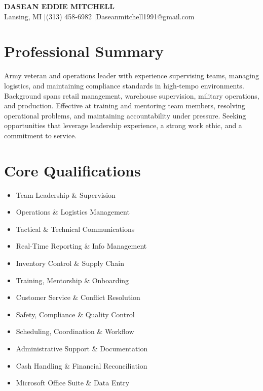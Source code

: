\documentclass[11pt,letterpaper]{article}
\begin{document}
\begin{center}
  {\LARGE\bfseries DASEAN EDDIE MITCHELL}\\[4pt]
  Lansing, MI \enspace$\vert$\enspace (313) 458-6982 \enspace$\vert$\enspace Daseanmitchell1991@gmail.com
\end{center}

\section{Professional Summary}

Army veteran and operations leader with experience supervising teams, managing logistics, and maintaining compliance standards in high-tempo environments. Background spans retail management, warehouse supervision, military operations, and production. Effective at training and mentoring team members, resolving operational problems, and maintaining accountability under pressure. Seeking opportunities that leverage leadership experience, a strong work ethic, and a commitment to service.

\section{Core Qualifications}

\begin{minipage}[t]{0.48\textwidth}
\begin{itemize}
  \item Team Leadership \& Supervision
  \item Operations \& Logistics Management
  \item Tactical \& Technical Communications
  \item Real-Time Reporting \& Info Management
  \item Inventory Control \& Supply Chain
  \item Training, Mentorship \& Onboarding
\end{itemize}
\end{minipage}
\hfill
\begin{minipage}[t]{0.48\textwidth}
\begin{itemize}
  \item Customer Service \& Conflict Resolution
  \item Safety, Compliance \& Quality Control
  \item Scheduling, Coordination \& Workflow
  \item Administrative Support \& Documentation
  \item Cash Handling \& Financial Reconciliation
  \item Microsoft Office Suite \& Data Entry
\end{itemize}
\end{minipage}
\end{document}
